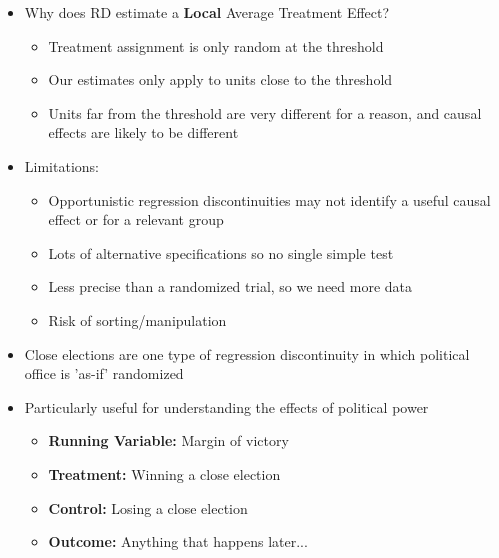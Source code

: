 \documentclass[xcolor=x11names,compress]{beamer}\usepackage[]{graphicx}\usepackage[]{color}
\renewcommand{\(}{\begin{columns}}
\renewcommand{\)}{\end{columns}}
\newcommand{\<}[1]{\begin{column}{#1}}
\renewcommand{\>}{\end{column}}
\begin{document}
\begin{frame}
\begin{itemize}
\item Why does RD estimate a \textbf{Local} Average Treatment Effect?
\pause
\begin{itemize}
\item Treatment assignment is only random at the threshold
\pause
\item Our estimates only apply to units close to the threshold
\pause
\item Units far from the threshold are very different for a reason, and causal effects are likely to be different
\end{itemize}
\end{itemize}
\end{frame}


\begin{frame}
\begin{itemize}
\item Limitations:
\begin{itemize}
\item Opportunistic regression discontinuities may not identify a useful causal effect or for a relevant group
\pause
\item Lots of alternative specifications so no single simple test
\pause
\item Less precise than a randomized trial, so we need more data
\pause
\item Risk of sorting/manipulation
\end{itemize}
\end{itemize}
\end{frame}

\begin{frame}
\begin{itemize}
\item Close elections are one type of regression discontinuity in which political office is 'as-if' randomized
\pause
\item Particularly useful for understanding the effects of political power
\pause
\begin{itemize}
\item \textbf{Running Variable: }Margin of victory
\item \textbf{Treatment: }Winning a close election
\item \textbf{Control: }Losing a close election
\item \textbf{Outcome: }Anything that happens later...
\end{itemize}
\end{itemize}
\end{frame}
\end{document}

